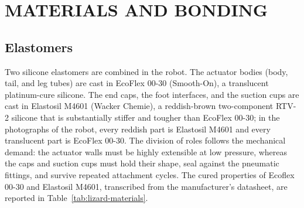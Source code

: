 

\section{MATERIALS AND BONDING}
\label{sec:lizard-materials}

\subsection{Elastomers}

Two silicone elastomers are combined in the robot. The actuator bodies
(body, tail, and leg tubes) are cast in EcoFlex 00-30 (Smooth-On), a
translucent platinum-cure silicone. The end caps, the foot interfaces,
and the suction cups are cast in Elastosil M4601 (Wacker Chemie), a
reddish-brown two-component RTV-2 silicone that is substantially stiffer
and tougher than EcoFlex 00-30; in the photographs of the robot, every
reddish part is Elastosil M4601 and every translucent part is
EcoFlex 00-30. The division of roles follows the mechanical demand: the
actuator walls must be highly extensible at low pressure, whereas the
caps and suction cups must hold their shape, seal against the pneumatic
fittings, and survive repeated attachment cycles. The cured properties of Ecoflex 00-30 and
Elastosil M4601, transcribed from the manufacturer's datasheet, are
reported in Table~\ref{tab:lizard-materials}.

